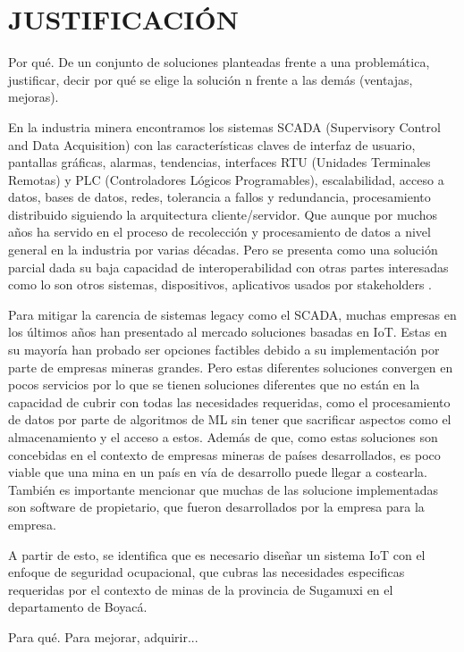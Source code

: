 \documentclass[stu,12pt,floatsintext]{apa7}
\begin{document}
	\section{JUSTIFICACIÓN}
		Por qué. De un conjunto de soluciones planteadas frente a una problemática, justificar, decir por qué se elige la solución n frente a las demás (ventajas, mejoras).
		
		En la industria minera encontramos los sistemas SCADA (Supervisory Control and Data Acquisition) con las características claves  de interfaz de usuario, pantallas gráficas, alarmas, tendencias, interfaces RTU (Unidades Terminales Remotas) y PLC (Controladores Lógicos Programables), escalabilidad, acceso a datos, bases de datos, redes, tolerancia a fallos y redundancia, procesamiento distribuido siguiendo la arquitectura cliente/servidor. Que aunque por muchos años ha servido en el proceso de recolección y procesamiento de datos a nivel general en la industria por varias décadas. Pero se presenta como una solución parcial dada su baja capacidad de interoperabilidad con otras partes interesadas como lo son otros sistemas, dispositivos, aplicativos usados por stakeholders \cite{SCADA_UMaT}.
		
		Para mitigar la carencia de sistemas legacy como el SCADA, muchas empresas en los últimos años han presentado al mercado soluciones basadas en IoT. Estas en su mayoría han probado ser opciones factibles debido a su implementación por parte de empresas mineras grandes. Pero estas diferentes soluciones convergen en pocos servicios por lo que se tienen soluciones diferentes que no están en la capacidad de cubrir con todas las necesidades requeridas, como el procesamiento de datos por parte de algoritmos de ML sin tener que sacrificar aspectos como el almacenamiento y el acceso a estos. Además de que, como estas soluciones son concebidas en el contexto de empresas mineras de países desarrollados, es poco viable que una mina en un país en vía de desarrollo puede llegar a costearla. También es importante mencionar que muchas de las solucione implementadas son software de propietario, que fueron desarrollados por la empresa para la empresa\cite{iot-platforms}.
		
		A partir de esto, se identifica que es necesario diseñar un sistema IoT con el enfoque de seguridad ocupacional, que cubras las necesidades especificas requeridas por el contexto de minas de la provincia de Sugamuxi en el departamento de Boyacá.
		
		Para qué. Para mejorar, adquirir...
		
\end{document}
